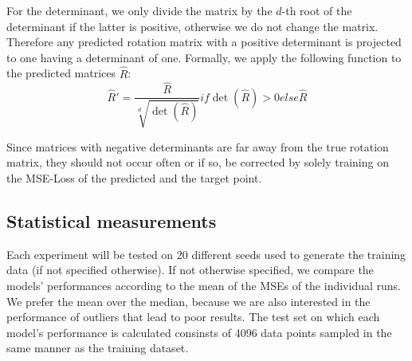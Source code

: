 For the determinant, we only divide the matrix by the $d$-th root of the determinant if the latter is positive, otherwise we do not change the matrix. Therefore any predicted rotation matrix with a positive determinant is projected to one having a determinant of one. Formally, we apply the following function to the predicted matrices $\hat{R}$:
\[\hat{R}' = \frac{\hat{R}}{\sqrt[d]{\det(\hat{R})}} if \det(\hat{R}) > 0 else \hat{R} \]

Since matrices with negative determinants are far away from the true rotation matrix, they should not occur often or if so, be corrected by solely training on the MSE-Loss of the predicted and the target point. 

\subsection{Statistical measurements}
Each experiment will be tested on 20 different seeds used to generate the training data (if not specified otherwise). If not otherwise specified, we compare the models' performances according to the mean of the MSEs of the individual runs. We prefer the mean over the median, because we are also interested in the performance of outliers that lead to poor results. The test set on which each model's performance is calculated consinsts of 4096 data points sampled in the same manner as the training dataset.\\



\[   \]








\clearpage

